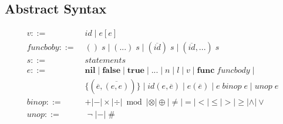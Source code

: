 \documentclass[12pt]{article}
\begin{document}
\subsection{Abstract Syntax}

\begin{align*}
v ::= \; & id \; | \; e[e]\\
funcboby ::= \; & () \; s \; | \; ({...}) \; s \;
| \; (\overline{id}) \; s \; | \; (\overline{id},{...}) \; s\\
s ::= \; & statements\\
e ::= \; & \textbf{nil} \; | \; \textbf{false} \; | \; \textbf{true} \;
| \; {...} \; | \; n \; | \; l \; | \; v \;
| \; \textbf{func} \; funcbody \; | \\
& \{(\overline{e},\overline{(e,e)})\} \;
| \; id(e,\overline{e}) \; | \; e(\overline{e}) \;
| \; e \; binop \; e \; | \; unop \; e\\
binop ::= & + | - | \times | \div | \bmod | \otimes | \oplus
  | \not= | = | < | \le | > | \ge | \land | \lor\\
unop ::= & \; \lnot \; | - | \; \#\\
\end{align*}
\end{document}
